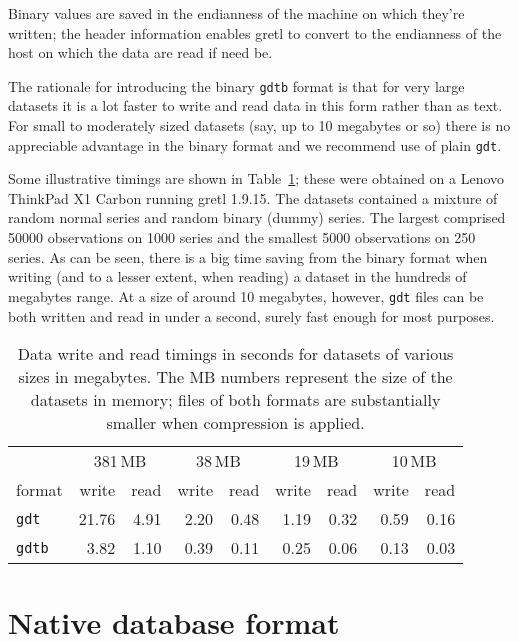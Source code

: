 Binary values are saved in the endianness of the machine on which
they're written; the header information enables gretl to convert to
the endianness of the host on which the data are read if need be.

The rationale for introducing the binary \texttt{gdtb} format is that
for very large datasets it is a lot faster to write and read data in
this form rather than as text. For small to moderately sized datasets
(say, up to 10 megabytes or so) there is no appreciable advantage in the
binary format and we recommend use of plain \texttt{gdt}. 

Some illustrative timings are shown in Table~\ref{tab:dataspeed};
these were obtained on a Lenovo ThinkPad X1 Carbon running gretl
1.9.15.  The datasets contained a mixture of random normal series and
random binary (dummy) series. The largest comprised 50000 observations
on 1000 series and the smallest 5000 observations on 250 series.  As
can be seen, there is a big time saving from the binary format when
writing (and to a lesser extent, when reading) a dataset in the
hundreds of megabytes range. At a size of around 10 megabytes,
however, \texttt{gdt} files can be both written and read in under a
second, surely fast enough for most purposes.

\begin{table}[htbp]
  \centering
  \begin{tabular}{lrr@{\hskip 2em}rr@{\hskip 2em}rr@{\hskip 2em}rr}
    & \multicolumn{2}{c}{381\,MB}
    & \multicolumn{2}{c}{38\,MB}
    & \multicolumn{2}{c}{19\,MB}
    & \multicolumn{2}{c}{10\,MB} \\
    format & write & read & write & read & write & read & write & read\\
    \texttt{gdt} & 
    21.76 & 4.91 & 2.20 & 0.48 & 1.19 & 0.32 & 0.59 & 0.16\\
    \texttt{gdtb} & 
    3.82 & 1.10 & 0.39 & 0.11 & 0.25 & 0.06 & 0.13 & 0.03
  \end{tabular}
  \caption{Data write and read timings in seconds for datasets
    of various sizes in megabytes. The MB numbers represent the 
    size of the datasets in memory; files of both formats are
    substantially smaller when compression is applied.}
  \label{tab:dataspeed}
\end{table}


\section{Native database format}
\label{dbdetails}

